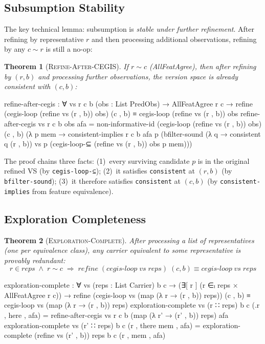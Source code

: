 \documentclass[9pt,a4paper]{article}
\theoremstyle{plain}
\newtheorem{theorem}{Theorem}
\theoremstyle{definition}
\theoremstyle{remark}
\begin{document}
\subsection{Subsumption Stability}

The key technical lemma: subsumption is \emph{stable under further refinement}.  After refining by representative $r$ and then processing additional observations, refining by any $c \sim r$ is still a no-op:

\begin{theorem}[\textsc{Refine-After-CEGIS}]
If $r \sim c$ (AllFeatAgree), then after refining by $(r, b)$ and processing further observations, the version space is already consistent with $(c, b)$:
\end{theorem}

\begin{code}
    refine-after-cegis : ∀ vs r c b (obs : List PredObs) →
      AllFeatAgree r c →
      refine (cegis-loop (refine vs (r , b)) obs) (c , b)
        ≡ cegis-loop (refine vs (r , b)) obs
    refine-after-cegis vs r c b obs afa =
      non-informative-id
        (cegis-loop (refine vs (r , b)) obs) (c , b)
        (λ p mem →
          consistent-implies r c b afa p
            (bfilter-sound (λ q → consistent q (r , b)) vs p
              (cegis-loop-⊆ (refine vs (r , b)) obs p mem)))
\end{code}

\noindent The proof chains three facts: (1)~every surviving candidate $p$ is in the original refined VS (by \texttt{cegis-loop-⊆}); (2)~it satisfies \texttt{consistent} at $(r, b)$ (by \texttt{bfilter-sound}); (3)~it therefore satisfies \texttt{consistent} at $(c, b)$ (by \texttt{consistent-implies} from feature equivalence).

\subsection{Exploration Completeness}

\begin{theorem}[\textsc{Exploration-Complete}]
After processing a list of representatives (one per equivalence class), any carrier equivalent to some representative is provably redundant:
\[
r \in \mathit{reps} \;\wedge\; r \sim c \;\Longrightarrow\; \mathit{refine}\;(\mathit{cegis\text{-}loop}\;\mathit{vs}\;\mathit{reps})\;(c, b) \equiv \mathit{cegis\text{-}loop}\;\mathit{vs}\;\mathit{reps}
\]
\end{theorem}

\begin{code}
    exploration-complete : ∀ vs (reps : List Carrier) b c →
      (∃[ r ] (r ∈ₗ reps × AllFeatAgree r c)) →
      refine (cegis-loop vs (map (λ r → (r , b)) reps)) (c , b)
        ≡ cegis-loop vs (map (λ r → (r , b)) reps)
    exploration-complete vs (r ∷ reps) b c (.r , here , afa) =
      refine-after-cegis vs r c b (map (λ r' → (r' , b)) reps) afa
    exploration-complete vs (r' ∷ reps) b c (r , there mem , afa) =
      exploration-complete (refine vs (r' , b)) reps b c (r , mem , afa)
\end{code}
\end{document}
